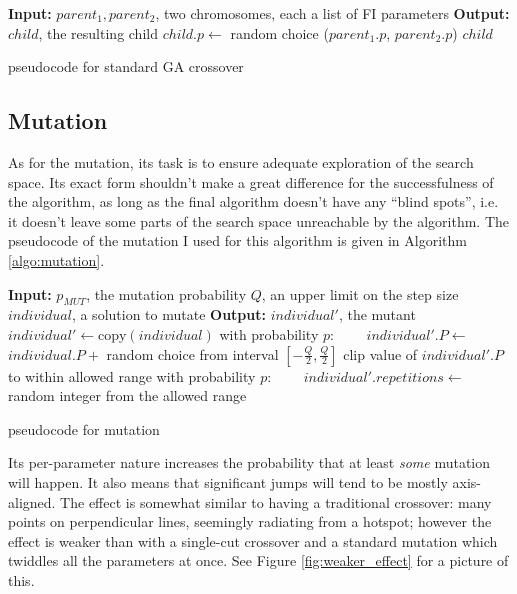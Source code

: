 \documentclass[times, utf8, diplomski]{fer}
\begin{document}
\begin{algorithm}
    \small
    \begin{algorithmic}
        \STATE \textbf{Input:} $parent_1, parent_2$, two chromosomes, each a list of FI parameters
        \STATE \textbf{Output:} $child$, the resulting child
            \STATE $child.p \gets $ random choice ($parent_1.p$, $parent_2.p$)
        \ENDFOR
        \RETURN $child$
    \end{algorithmic}
    \caption{pseudocode for standard GA crossover}
    \label{algo:standard_crossover}
\end{algorithm}


\subsection{Mutation}
As for the mutation, its task is to ensure adequate exploration of the search
space. Its exact form shouldn't make a great difference for the successfulness
of the algorithm, as long as the final algorithm doesn't have any ``blind spots'',
i.e. it doesn't leave some parts of the search space unreachable by the algorithm.
The pseudocode of the mutation I used for this algorithm is given in Algorithm \ref{algo:mutation}.

\begin{algorithm}[!htbp]
    \small
    \begin{algorithmic}
        \STATE \textbf{Input:} $p_{MUT}$, the mutation probability
        \STATE \textbf{\hphantom{Input:}} $Q$, an upper limit on the step size
        \STATE \textbf{\hphantom{Input:}} $individual$, a solution to mutate
        \STATE \textbf{Output:} $individual'$, the mutant
        \STATE $individual' \gets \text{copy}(individual)$
            \STATE with probability $p$:
            \STATE ~~~~$individual'.P \gets $ $individual.P + $ random choice from interval $[-\frac{Q}{2}, \frac{Q}{2}]$
            \STATE clip value of $individual'.P$ to within allowed range
        \ENDFOR
        \STATE with probability $p$:
        \STATE ~~~~$individual'.repetitions \gets $ random integer from the allowed range
    \end{algorithmic}
    \caption{pseudocode for mutation}
    \label{algo:mutation}
\end{algorithm}


Its per-parameter nature increases the probability that at least \emph{some}
mutation will happen. It also means that significant jumps will tend to be mostly
axis-aligned. The effect is somewhat similar to having a traditional crossover:
many points on perpendicular lines, seemingly radiating from a hotspot; however
the effect is weaker than with a single-cut crossover and a standard mutation
which twiddles all the parameters at once. See Figure \ref{fig:weaker_effect}
for a picture of this.
\end{document}
